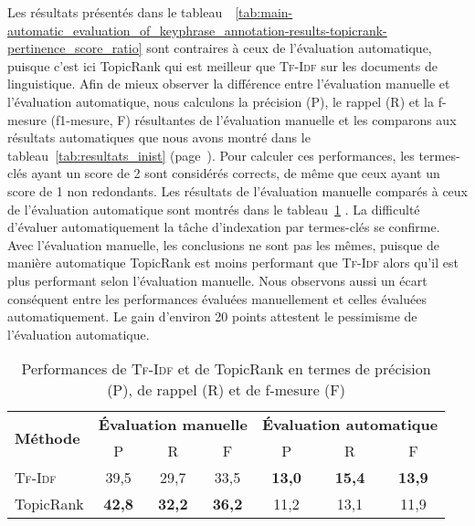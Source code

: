         Les résultats présentés dans le
        tableau~~\ref{tab:main-automatic_evaluation_of_keyphrase_annotation-results-topicrank-pertinence_score_ratio}
        sont contraires à ceux de l'évaluation automatique, puisque c'est ici
        TopicRank qui est meilleur que \textsc{Tf-Idf} sur les documents de
        linguistique. Afin de mieux observer la différence entre l'évaluation
        manuelle et l'évaluation automatique, nous calculons la précision (P),
        le rappel (R) et la f-mesure (f1-mesure, F) résultantes de l'évaluation
        manuelle et les comparons aux résultats automatiques que nous avons
        montré dans le tableau~\ref{tab:resultats_inist}
        (page~\pageref{tab:resultats_inist}). Pour calculer ces performances,
        les termes-clés ayant un score de 2 sont considérés corrects, de même
        que ceux ayant un score de 1 non redondants. Les résultats de
        l'évaluation manuelle comparés à ceux de l'évaluation automatique sont
        montrés dans le
        tableau~\ref{tab:main-automatic_evaluation_of_keyphrase_annotation-results-topicrank-prf}
        . La difficulté d'évaluer automatiquement la tâche d'indexation par
        termes-clés se confirme. Avec l'évaluation manuelle, les conclusions ne
        sont pas les mêmes, puisque de manière automatique TopicRank est moins
        performant que \textsc{Tf-Idf} alors qu'il est plus performant selon
        l'évaluation manuelle. Nous observons aussi un écart conséquent entre
        les performances évaluées manuellement et celles évaluées
        automatiquement. Le gain d'environ 20 points attestent le pessimisme de
        l'évaluation automatique.
        \begin{table}[h!]
          \centering
          \begin{tabular}{l|ccc|ccc}
            \toprule
            \multirow{2}{*}{\textbf{Méthode}} & \multicolumn{3}{c|}{\textbf{Évaluation manuelle}} & \multicolumn{3}{c}{\textbf{Évaluation automatique}}\\
            \cline{2-7}
            & P & R & F & P & R & F\\
            \hline
            \textsc{Tf-Idf} & 39,5 & 29,7 & 33,5 & \textbf{13,0} & \textbf{15,4} & \textbf{13,9}\\
            TopicRank & \textbf{42,8} & \textbf{32,2} & \textbf{36,2} & 11,2 & 13,1 & 11,9\\
            \bottomrule
          \end{tabular}
          \caption[
            Performances de \textsc{Tf-Idf} et de TopicRank en termes de
            précision, de rappel et de f-mesure
          ]{
            Performances de \textsc{Tf-Idf} et de TopicRank en termes de
            précision (P), de rappel (R) et de f-mesure (F)
            \label{tab:main-automatic_evaluation_of_keyphrase_annotation-results-topicrank-prf}}
        \end{table}
      
